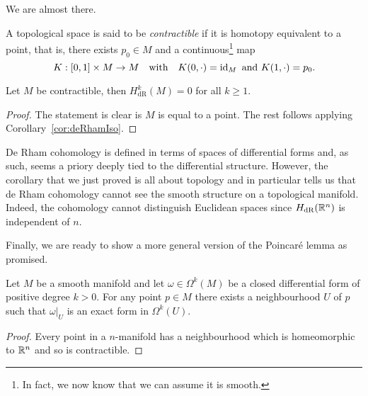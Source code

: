 We are almost there.

\begin{definition}
  A topological space is said to be \emph{contractible} if it is homotopy equivalent to a point, that is, there exists $p_0\in M$ and a continuous\footnote{In fact, we now know that we can assume it is smooth.} map
  \begin{equation}
    K:[0,1]\times M \to M
    \quad\mbox{with}\quad
    K(0, \cdot) = \operatorname{id}_M
    \mbox{ and }
    K(1, \cdot) = p_0.
  \end{equation}
\end{definition}

\begin{corollary}
  Let $M$ be contractible, then $H^k_{\mathrm{dR}}(M)=0$ for all $k\geq 1$.
\end{corollary}
\begin{proof}
The statement is clear is $M$ is equal to a point.
The rest follows applying Corollary~\ref{cor:deRhamIso}.
\end{proof}

\begin{remark}
De Rham cohomology is defined in terms of spaces of differential forms and, as such, seems a priory deeply tied to the differential structure.
However, the corollary that we just proved is all about topology and in particular tells us that de Rham cohomology cannot see the smooth structure on a topological manifold.
Indeed, the cohomology cannot distinguish Euclidean spaces since $H_{\mathrm{dR}}(\mathbb{R}^n)$ is independent of $n$. 
\end{remark}

Finally, we are ready to show a more general version of the Poincar\'e lemma as promised.

\begin{corollary}\label{cor:plemma}
  Let $M$ be a smooth manifold and let $\omega\in\Omega^k(M)$ be a closed differential form of positive degree $k>0$.
  For any point $p\in M$ there exists a neighbourhood $U$ of $p$ such that $\omega|_U$ is an exact form in $\Omega^k(U)$.
\end{corollary}
\begin{proof}
Every point in a $n$-manifold has a neighbourhood which is homeomorphic to $\mathbb{R}^n$ and so is contractible.
\end{proof}
